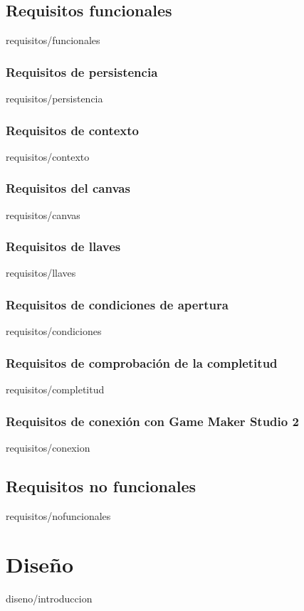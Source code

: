 \documentclass[epsbased,copyright,final,printable,covers,extendedindex,firstnumbered,tfg,gnuplot]{tfgtfmthesisuam}
\begin{document}
	\section{Requisitos funcionales\label{SEC:REQUISITOSFUNCIONALES}}{requisitos/funcionales}
		\begin{functional}
		\subsection{Requisitos de persistencia\label{SUBSEC:PERSISTENCIA}}{requisitos/persistencia}
		\subsection{Requisitos de contexto\label{SUBSEC:CONTEXTO}}{requisitos/contexto}
		\subsection{Requisitos del canvas\label{SUBSEC:CANVAS}}{requisitos/canvas}
		\subsection{Requisitos de llaves\label{SUBSEC:LLAVES}}{requisitos/llaves}
		\subsection{Requisitos de condiciones de apertura\label{SUBSEC:CONDICIONES}}{requisitos/condiciones}
		\subsection{Requisitos de comprobación de la completitud\label{SUBSEC:COMPLETITUD}}{requisitos/completitud}
		\subsection{Requisitos de conexión con Game Maker Studio 2\label{SUBSEC:CONEXION}}{requisitos/conexion}
		\end{functional}
	\section{Requisitos no funcionales\label{SEC:REQUISITOSNOFUNCIONALES}}{requisitos/nofuncionales}
	
\chapter{Diseño\label{CAP:DISENO}}{diseno/introduccion}
\end{document}
